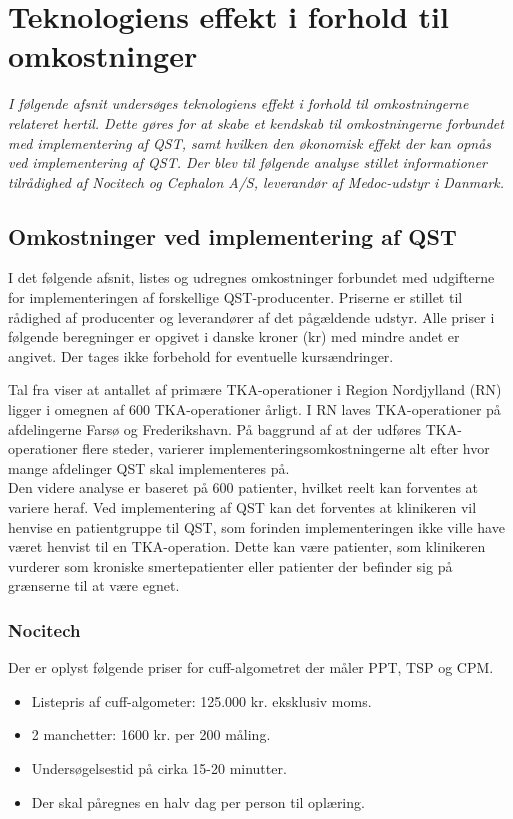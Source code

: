 \section{Teknologiens effekt i forhold til omkostninger} \label{priser}
\textit{I følgende afsnit undersøges teknologiens effekt i forhold til omkostningerne relateret hertil. Dette gøres for at skabe et kendskab til omkostningerne forbundet med implementering af QST, samt hvilken den økonomisk effekt der kan opnås ved implementering af QST. Der blev til følgende analyse stillet informationer tilrådighed af Nocitech og Cephalon A/S, leverandør af Medoc-udstyr i Danmark.}

\subsection{Omkostninger ved implementering af QST}
I det følgende afsnit, listes og udregnes omkostninger forbundet med udgifterne for implementeringen af forskellige QST-producenter. Priserne er stillet til rådighed af producenter og leverandører af det pågældende udstyr. Alle priser i følgende beregninger er opgivet i danske kroner (kr) med mindre andet er angivet. Der tages ikke forbehold for eventuelle kursændringer. 

Tal fra  viser at antallet af primære TKA-operationer i Region Nordjylland (RN) ligger i omegnen af 600 TKA-operationer årligt. \citep{aarsrapport2016} I RN laves TKA-operationer på afdelingerne Farsø og Frederikshavn. På baggrund af at der udføres TKA-operationer flere steder, varierer implementeringsomkostningerne alt efter hvor mange afdelinger QST skal implementeres på. \\
Den videre analyse er baseret på 600 patienter, hvilket reelt kan forventes at variere heraf. Ved implementering af QST kan det forventes at klinikeren vil henvise en patientgruppe til QST, som forinden implementeringen ikke ville have været henvist til en TKA-operation. Dette kan være patienter, som klinikeren vurderer som kroniske smertepatienter eller patienter der befinder sig på grænserne til at være egnet. 

\subsubsection{Nocitech}
Der er oplyst følgende priser for cuff-algometret der måler PPT, TSP og CPM.
\begin{itemize}  
\item Listepris af cuff-algometer: 125.000 kr. eksklusiv moms.
\item 2 manchetter: 1600 kr. per 200 måling.
\item Undersøgelsestid på cirka 15-20 minutter.
\item Der skal påregnes en halv dag per person til oplæring.
\end{itemize}

